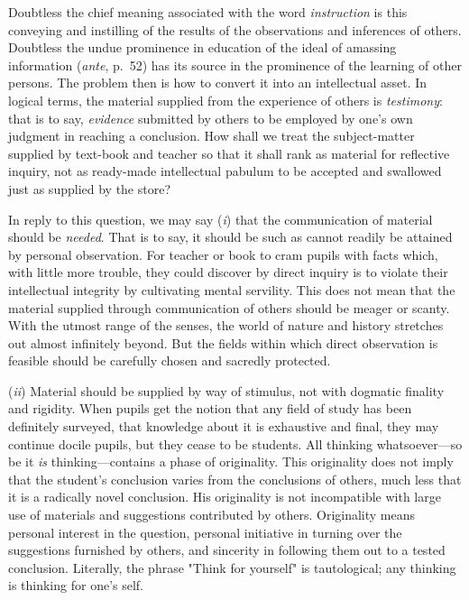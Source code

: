 \documentclass[showtrims,ustradepaper]{memoir}
\begin{document}

Doubtless the chief meaning associated with the word \emph{instruction}
is this conveying and instilling of the results of the observations and
inferences of others. Doubtless the undue prominence in education of the
ideal of amassing information (\emph{ante}, p.\ 52) has its source in the
prominence of the learning of other persons. The problem then is how to
convert it into an intellectual asset. In logical terms, the material
supplied from the experience of others is \emph{testimony}: that is to
say, \emph{evidence} submitted by others to be employed by one's own
judgment in reaching a conclusion. How shall we treat the subject-matter
supplied by text-book and teacher so that it shall rank as material for
reflective
inquiry, not as ready-made intellectual pabulum to be accepted and
swallowed just as supplied by the store?


In reply to this question, we may say (\emph{i}) that the communication
of material should be \emph{needed}. That is to say, it should be such
as cannot readily be attained by personal observation. For teacher or
book to cram pupils with facts which, with little more trouble, they
could discover by direct inquiry is to violate their intellectual
integrity by cultivating mental servility. This does not mean that the
material supplied through communication of others should be meager or
scanty. With the utmost range of the senses, the world of nature and
history stretches out almost infinitely beyond. But the fields within
which direct observation is feasible should be carefully chosen and
sacredly protected.


(\emph{ii}) Material should be supplied by way of stimulus, not with
dogmatic finality and rigidity. When pupils get the notion that any
field of study has been definitely surveyed, that knowledge about it is
exhaustive and final, they may continue docile pupils, but they cease to
be students. All thinking whatsoever---so be it \emph{is}
thinking---contains a phase of originality. This originality does not
imply that the student's conclusion varies from the conclusions of
others, much less that it is a radically novel conclusion. His
originality is not incompatible with large use of materials and
suggestions contributed by others. Originality means personal interest
in the question, personal initiative in turning over the suggestions
furnished by others, and sincerity in following them out to a tested
conclusion. Literally, the phrase "Think for yourself" is tautological;
any thinking is thinking for one's
self.
\end{document}
